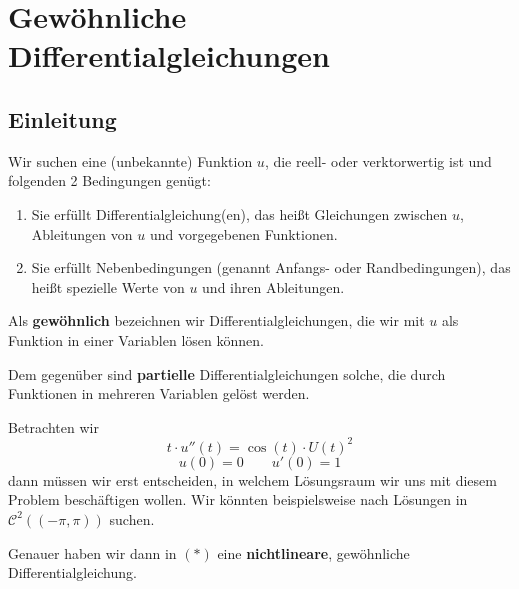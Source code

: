 \documentclass[main.tex]{subfiles}
\begin{document}
\chapter{Gewöhnliche Differentialgleichungen}


\section{Einleitung}

\begin{Definition}
  Wir suchen eine (unbekannte) Funktion $u$, die reell- oder verktorwertig ist und folgenden 2 Bedingungen genügt:
  \begin{enumerate}
    \item Sie erfüllt Differentialgleichung(en), das heißt Gleichungen zwischen $u$, Ableitungen von $u$ und vorgegebenen Funktionen.
    \item Sie erfüllt Nebenbedingungen (genannt Anfangs- oder Randbedingungen), das heißt spezielle Werte von $u$ und ihren Ableitungen.
  \end{enumerate}

  Als \textbf{gewöhnlich} bezeichnen wir Differentialgleichungen, die wir mit $u$ als Funktion in einer Variablen lösen können.

  Dem gegenüber sind \textbf{partielle} Differentialgleichungen solche, die durch Funktionen in mehreren Variablen gelöst werden.
\end{Definition}

\begin{Beispiel}[Allgemein]
  Betrachten wir
  \begin{equation*}
  t \cdot u''(t) = \cos(t) \cdot U(t)^2 \tag{*}
  \end{equation*}
  $$u(0) = 0 \qquad u'(0) = 1$$
  dann müssen wir erst entscheiden, in welchem Lösungsraum wir uns mit diesem Problem beschäftigen wollen. Wir könnten beispielsweise nach Lösungen in $\mathcal{C}^2 ((-\pi,\pi))$ suchen.

  Genauer haben wir dann in $(*)$ eine \textbf{nichtlineare}, gewöhnliche Differentialgleichung.
\end{Beispiel}
\end{document}
